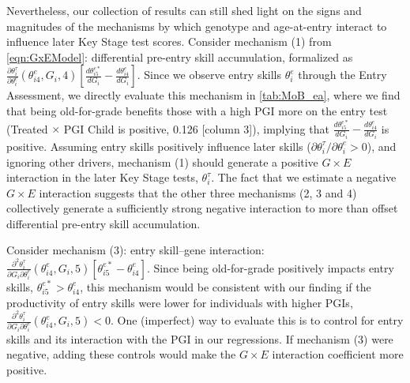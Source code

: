 \documentclass[12pt,a4paper]{article}
\begin{document}
\begin{bibunit}
Nevertheless, our collection of results can still shed light on the signs and magnitudes of the  mechanisms by which genotype and age-at-entry interact to influence later Key Stage test scores. Consider mechanism (1) from \autoref{eqn:GxEModel}: differential pre-entry skill accumulation, formalized as $\frac{\partial \theta_{i}^\tau}{\partial \theta_{i}^e}\left(\theta_{i4}^{e}, G_{i}, 4\right) \left[\frac{d \theta_{i 5}^{e *} }{d G_i}- \frac{d \theta_{i 4}^e}{d G_i}\right]$.  Since we observe entry skills $\theta_{i}^{e}$ through the Entry Assessment, we directly evaluate this mechanism in \autoref{tab:MoB_ea}, where we find that being old-for-grade benefits those with a high PGI more on the entry test (Treated $\times$ PGI Child is positive, 0.126 [column 3]),  implying that $\frac{d \theta_{i 5}^{e *} }{d G_i}- \frac{d\theta_{i 4}^e}{d G_i}$ is positive. Assuming entry skills positively influence later skills ($\partial \theta_{i}^\tau/{\partial \theta_{i}^e}>0$), and ignoring other drivers, mechanism (1) should generate a positive $G\times{}E$ interaction in the later Key Stage tests, $\theta_{i}^\tau$. The fact that we estimate a negative $G\times{}E$ interaction suggests that the other three mechanisms (2, 3 and 4) collectively generate a sufficiently strong negative interaction to more than offset differential pre-entry skill accumulation.  

Consider mechanism (3): entry skill--gene interaction: $\frac{\partial^2 \theta_{i}^\tau}{\partial G_i \partial \theta_{i}^e}\left(\theta_{i 4}^{e}, G_{i}, 5\right)\left[\theta_{i 5}^{e*}-\theta_{i 4}^e\right]$.  Since being old-for-grade positively impacts entry skills, $\theta_{i 5}^{e*}>\theta_{i 4}^e$, this mechanism would be consistent with our finding  if the productivity of entry skills were lower for individuals with higher PGIs, $\frac{\partial^2 \theta_{i}^\tau}{\partial G_i \partial \theta_{i}^e}\left(\theta_{i 4}^{e}, G_{i}, 5\right) < 0$. One (imperfect) way to evaluate this is to control for entry skills and its interaction with the PGI in our regressions. If mechanism (3) were negative, adding these controls would make the $G\times E$ interaction coefficient more positive. 


\end{bibunit}
\end{document}
